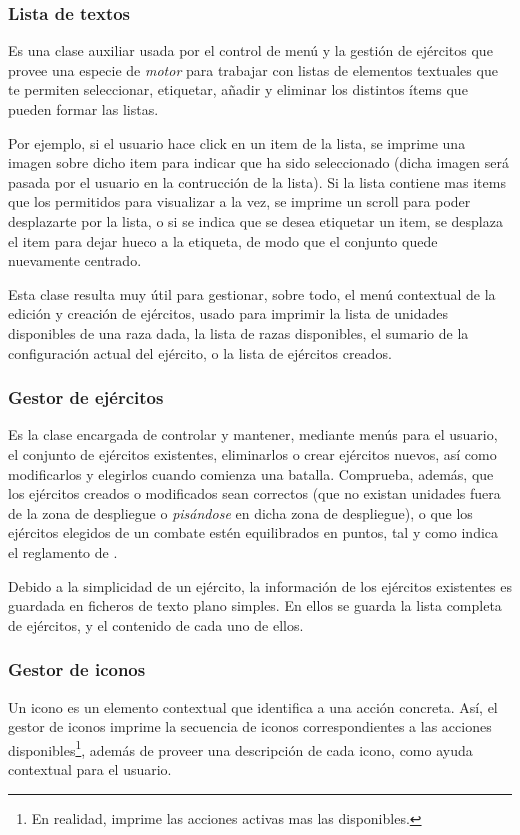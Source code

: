 \subsubsection{Lista de textos}
Es una clase auxiliar usada por el control de menú y la gestión de
ejércitos que provee una especie de \emph{motor} para trabajar con
listas de elementos textuales que te permiten seleccionar, etiquetar,
añadir y eliminar los distintos ítems que pueden formar las listas.

Por ejemplo, si el usuario hace click en un item de la lista, se
imprime una imagen sobre dicho item para
indicar que ha sido seleccionado (dicha imagen será pasada por el
usuario en la contrucción de la lista). Si la lista contiene mas items
que los permitidos para visualizar a la vez, se imprime un scroll para
poder desplazarte por la lista, o si se indica que se desea etiquetar
un item, se desplaza el item para dejar hueco a la etiqueta, de modo
que el conjunto quede nuevamente centrado.

Esta clase resulta muy útil para gestionar, sobre todo, el menú
contextual de la edición y creación de ejércitos, usado para imprimir
la lista de unidades disponibles de una raza dada, la lista de razas
disponibles, el sumario de la configuración actual del ejército, o la
lista de ejércitos creados.

\subsubsection{Gestor de ejércitos}
Es la clase encargada de controlar y mantener, mediante menús para el
usuario, el conjunto de ejércitos existentes, eliminarlos o crear
ejércitos nuevos, así como 
modificarlos y elegirlos cuando comienza una batalla. Comprueba,
además, que los ejércitos creados o modificados sean correctos (que no
existan unidades fuera de la zona de despliegue o \emph{pisándose} en
dicha zona de despliegue), o que los ejércitos elegidos de un combate
estén equilibrados en puntos, tal y como indica el reglamento de
\gomf.

Debido a la simplicidad de un ejército, la información de los
ejércitos existentes es guardada en ficheros de texto plano
simples. En ellos se guarda la lista completa de ejércitos, y el
contenido de cada uno de ellos.

\subsubsection{Gestor de iconos}
Un icono es un elemento contextual que identifica a una acción
concreta. Así, el gestor de iconos imprime la secuencia de iconos
correspondientes a las acciones disponibles\footnote{En realidad,
  imprime las acciones activas mas las disponibles.}, además de
proveer una descripción de cada icono, como ayuda contextual para el
usuario.


